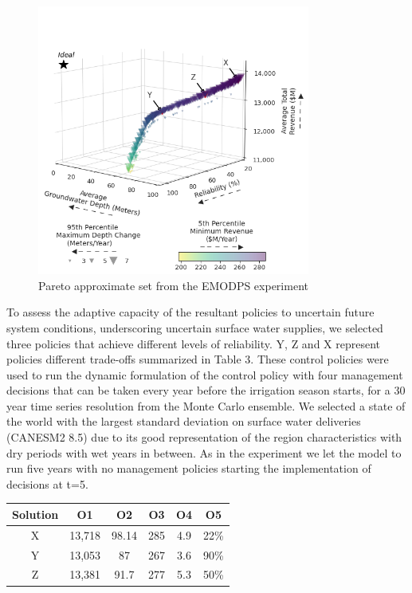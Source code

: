 \documentclass[11pt,a4paper]{article}
\begin{document}
\begin{figure}[H]
    \centering
    \includegraphics[width=0.8\textwidth]{selected_policies_3d.png}
    \caption{Pareto approximate set from the EMODPS experiment} \label{fig:parallel_robustness}
\end{figure}

To assess the adaptive capacity of the resultant policies to uncertain future system conditions, underscoring uncertain surface water supplies, we selected three policies that achieve different levels of reliability. Y, Z and X represent policies different trade-offs summarized in Table 3. These control policies were used to run the dynamic formulation of the control policy with four management decisions that can be taken every year before the irrigation season starts, for a 30 year time series resolution from the Monte Carlo ensemble. We selected a state of the world with the largest standard deviation on surface water deliveries (CANESM2 8.5) due to its good representation of the region characteristics with dry periods with wet years in between. As in the experiment we let the model to run five years with no management policies starting the implementation of decisions at t=5.

\begin{center}
\begin{tabular}{ |c|c|c|c|c|c| }
 \hline
 Solution & O1 & O2 & O3 & O4 & O5 \\ 
 \hline
X &  13,718 & 98.14 &  285 & 4.9 & 22\% \\
Y &  13,053 & 87 & 267 & 3.6 & 90\% \\
Z &  13,381 & 91.7  & 277 & 5.3 & 50\% \\
\hline
\end{tabular}
\end{center}
\end{document}
